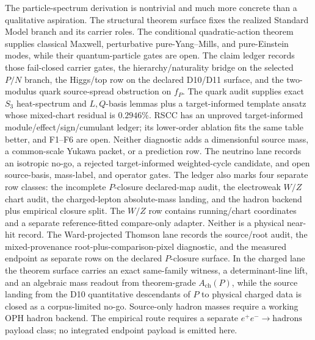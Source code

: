 \documentclass[11pt]{article}
\begin{document}
The particle-spectrum derivation is nontrivial and much more concrete than a qualitative aspiration.
The structural theorem surface fixes the realized Standard Model branch and its carrier roles.
The conditional quadratic-action theorem supplies classical Maxwell, perturbative pure-Yang--Mills,
and pure-Einstein modes, while their quantum-particle gates are open. The claim ledger
records those fail-closed carrier gates, the hierarchy/naturality bridge on the selected \(P/N\) branch, the Higgs/top row
on the declared D10/D11 surface, and the two-modulus quark source-spread obstruction on \(f_P\).
The quark audit supplies exact \(S_3\) heat-spectrum and \(L,Q\)-basis lemmas plus a
target-informed template ansatz whose mixed-chart residual is \(0.2946\%\). RSCC has an unproved
target-informed module/effect/sign/cumulant ledger; its lower-order ablation fits the same table
better, and F1--F6 are open. Neither diagnostic adds a dimensionful source mass, a common-scale
Yukawa packet, or a prediction row. The neutrino lane records an
isotropic no-go, a rejected target-informed weighted-cycle candidate, and open source-basis,
mass-label, and operator gates. The ledger also marks four separate row classes: the incomplete
\(P\)-closure declared-map audit, the electroweak \(W/Z\) chart audit, the charged-lepton
absolute-mass landing, and the hadron backend plus empirical closure split.
The \(W/Z\) row contains running/chart coordinates and a separate reference-fitted compare-only adapter.
Neither is a physical near-hit record. The
Ward-projected Thomson lane records the source/root audit, the mixed-provenance
root-plus-comparison-pixel diagnostic, and the measured endpoint as separate rows on the declared
\(P\)-closure surface. In the charged lane the theorem surface carries an exact
same-family witness, a determinant-line lift, and an algebraic mass readout from
theorem-grade \(A_{\mathrm{ch}}(P)\), while the source landing from the D10 quantitative
descendants of \(P\) to physical charged data is closed as a corpus-limited no-go. Source-only
hadron masses require a working OPH hadron backend. The empirical route requires a separate
\(e^+e^-\to\mathrm{hadrons}\) payload class; no integrated endpoint payload is emitted here.
\end{document}
